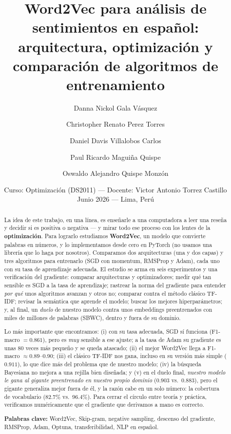 \documentclass[11pt]{article}
\title{\textbf{Word2Vec para análisis de sentimientos en español:\\
arquitectura, optimización y comparación de algoritmos de entrenamiento}}
\author{Danna Nickol Gala Vásquez \and Christopher Renato Perez Torres \and
Daniel Davis Villalobos Carlos \and Paul Ricardo Maguiña Quispe \and
Oswaldo Alejandro Quispe Monzón}
\date{Curso: Optimización (DS2011) --- Docente: Victor Antonio Torrez Castillo \\ Junio 2026 --- Lima, Perú}
\begin{document}
\maketitle

\begin{abstract}
La idea de este trabajo, en una línea, es enseñarle a una computadora a leer una reseña y
decidir si es positiva o negativa --- y mirar todo ese proceso con los lentes de la
\textbf{optimización}. Para lograrlo estudiamos \textbf{Word2Vec}, un modelo que convierte
palabras en números, y lo implementamos desde cero en PyTorch (no usamos una librería que lo
haga por nosotros). Comparamos dos arquitecturas (una y dos capas) y tres algoritmos para
entrenarlo (SGD con momentum, RMSProp y Adam), cada uno con su tasa de aprendizaje adecuada.
El estudio se arma en seis experimentos y una verificación del gradiente: comparar
arquitecturas y optimizadores; medir qué tan sensible es SGD a la tasa de aprendizaje;
rastrear la norma del gradiente para entender \emph{por qué} unos algoritmos avanzan y otros
no; comparar contra el método clásico TF-IDF; revisar la semántica que aprende el modelo;
buscar los mejores hiperparámetros; y, al final, un \emph{duelo} de nuestro modelo contra
unos embeddings preentrenados con miles de millones de palabras (SBWC), dentro y fuera de su
dominio.

Lo más importante que encontramos: (i) con su tasa adecuada, SGD sí funciona (F1-macro
$=0.861$), pero es \emph{muy} sensible a ese ajuste; a la tasa de Adam su gradiente es unas
80 veces más pequeño y se queda atascado; (ii) el mejor Word2Vec llega a F1-macro $\approx
0.89$--$0.90$; (iii) el clásico TF-IDF nos gana, incluso en su versión más simple
($0.911$), lo que dice más del problema que de nuestro modelo; (iv) la búsqueda Bayesiana no
mejora a una rejilla bien diseñada; y (v) en el duelo final, \emph{nuestro modelo le gana al
gigante preentrenado en nuestro propio dominio} ($0.903$ vs.\ $0.883$), pero el gigante
generaliza mejor fuera de él, y la razón cabe en un solo número: la cobertura de vocabulario
($82.7\%$ vs.\ $96.4\%$). Para cerrar el círculo entre teoría y práctica, verificamos
numéricamente que el gradiente que derivamos a mano es correcto.

\medskip
\noindent\textbf{Palabras clave:} Word2Vec, Skip-gram, negative sampling, descenso del
gradiente, RMSProp, Adam, Optuna, transferibilidad, NLP en español.
\end{abstract}
\end{document}
